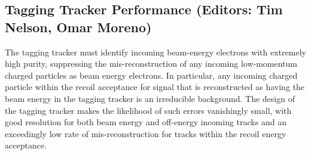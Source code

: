 
\subsection{Tagging Tracker Performance (Editors: Tim Nelson, Omar Moreno)}


The tagging tracker must identify incoming beam-energy electrons with extremely high purity, suppressing the mis-reconstruction of any incoming low-momentum charged particles as beam energy electrons. In particular, any incoming charged particle within the recoil acceptance for signal that is reconstructed as having the beam energy in the tagging tracker is an irreducible background. The design of the tagging tracker makes the likelihood of such errors vanishingly small, with good resolution for both beam energy and off-energy incoming tracks and an exceedingly low rate of mis-reconstruction for tracks within the recoil energy acceptance.

